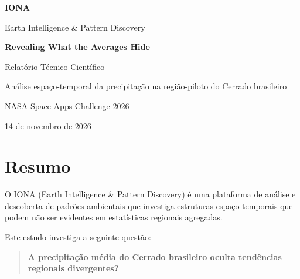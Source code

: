 \documentclass[12pt,a4paper]{article}
\begin{document}
\begin{titlepage}
    \centering

    \vspace*{2cm}

    {\Huge\bfseries IONA\par}

    \vspace{0.5cm}

    {\Large Earth Intelligence \& Pattern Discovery\par}

    \vspace{1.5cm}

    {\LARGE\bfseries Revealing What the Averages Hide\par}

    \vspace{2cm}

    {\Large Relatório Técnico-Científico\par}

    \vspace{1cm}

    {\large Análise espaço-temporal da precipitação na
    região-piloto do Cerrado brasileiro\par}

    \vfill

    {\large NASA Space Apps Challenge 2026\par}

    \vspace{0.5cm}

    {\large 14 de novembro de 2026\par}

\end{titlepage}

\tableofcontents
\newpage

\section{Resumo}

O IONA (Earth Intelligence \& Pattern Discovery) é uma
plataforma de análise e descoberta de padrões ambientais
que investiga estruturas espaço-temporais que podem não
ser evidentes em estatísticas regionais agregadas.

Este estudo investiga a seguinte questão:

\begin{quote}
\textbf{A precipitação média do Cerrado brasileiro oculta
tendências regionais divergentes?}
\end{quote}
\end{document}
